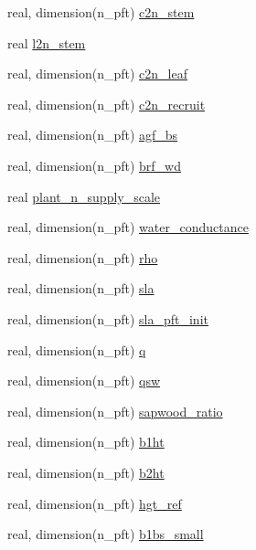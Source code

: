 \begin{DoxyCompactItemize}
real, dimension(n\+\_\+pft) \hyperlink{namespacepft__coms_a45821066c1cdf886389c40c7ddbefa7f}{c2n\+\_\+stem}
\item 
real \hyperlink{namespacepft__coms_aadbb3423514f8f93b48b2a626d4b000d}{l2n\+\_\+stem}
\item 
real, dimension(n\+\_\+pft) \hyperlink{namespacepft__coms_a62386599b26b4cf8d478b513f813d974}{c2n\+\_\+leaf}
\item 
real, dimension(n\+\_\+pft) \hyperlink{namespacepft__coms_ad105c123dc17ca1fb99476b476e035a4}{c2n\+\_\+recruit}
\item 
real, dimension(n\+\_\+pft) \hyperlink{namespacepft__coms_a9d509e7c71beaa9054f49d583f01f433}{agf\+\_\+bs}
\item 
real, dimension(n\+\_\+pft) \hyperlink{namespacepft__coms_aad5b7cd93696f04e149139562ce0f7be}{brf\+\_\+wd}
\item 
real \hyperlink{namespacepft__coms_a519f5d42172d290ddad951a2744c5a20}{plant\+\_\+n\+\_\+supply\+\_\+scale}
\item 
real, dimension(n\+\_\+pft) \hyperlink{namespacepft__coms_a57b4aabb4896e59800ec2159c64d06b3}{water\+\_\+conductance}
\item 
real, dimension(n\+\_\+pft) \hyperlink{namespacepft__coms_aec4095886699dcf26ce469d85c675ed5}{rho}
\item 
real, dimension(n\+\_\+pft) \hyperlink{namespacepft__coms_ad1aabb01620d2b7320709e93cfe784f8}{sla}
\item 
real, dimension(n\+\_\+pft) \hyperlink{namespacepft__coms_a535eacb23669b894d3f37596a40673e2}{sla\+\_\+pft\+\_\+init}
\item 
real, dimension(n\+\_\+pft) \hyperlink{namespacepft__coms_a94feb354a8416167ef0ff2690843ebcd}{q}
\item 
real, dimension(n\+\_\+pft) \hyperlink{namespacepft__coms_a646ad26118949294d5b8007435e7d33d}{qsw}
\item 
real, dimension(n\+\_\+pft) \hyperlink{namespacepft__coms_ad00617b976d68174e6d5fb6227be9d90}{sapwood\+\_\+ratio}
\item 
real, dimension(n\+\_\+pft) \hyperlink{namespacepft__coms_a00f748893c4f7254524515d560a16eee}{b1ht}
\item 
real, dimension(n\+\_\+pft) \hyperlink{namespacepft__coms_a5c7b374e94930d3266444e1ef0539447}{b2ht}
\item 
real, dimension(n\+\_\+pft) \hyperlink{namespacepft__coms_a8cc0c7c9a26d749fd17c1ddc8633ea8a}{hgt\+\_\+ref}
\item 
real, dimension(n\+\_\+pft) \hyperlink{namespacepft__coms_a9a7ea1fec116893e64d9d8ace1c14e0c}{b1bs\+\_\+small}

\end{DoxyCompactItemize}
